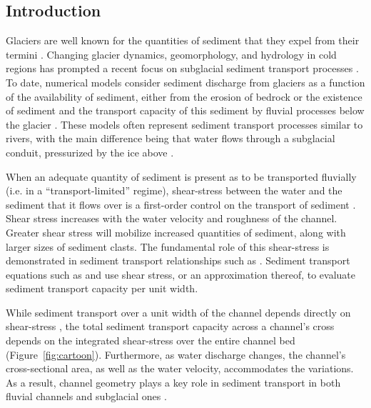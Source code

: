 \documentclass[11pt]{article}
\begin{document}
        
        \begin{spacing}{1}
          \section{Introduction}
           
          Glaciers are well known for the quantities of sediment that they expel from their termini \citep{hallet1996}.
          Changing glacier dynamics, geomorphology, and hydrology in cold regions has prompted a recent focus on subglacial sediment transport processes \citep[e.g.][]{zhang2022}.
          To date, numerical models consider sediment discharge from glaciers as a function of the availability of sediment, either from the erosion of bedrock or the existence of sediment and the transport capacity of this sediment by fluvial processes below the glacier \citep{creyts2013,brinkerhoff2017,beaud2018,delaney2019}.
          These models often represent sediment transport processes similar to rivers, with the main difference being that water flows through a subglacial conduit, pressurized by the ice above \citep{rothlisberger1972}.
        
          When an adequate quantity of sediment is present as to be transported fluvially (i.e. in a ``transport-limited'' regime), shear-stress between the water and the sediment that it flows over is a first-order control on the transport of sediment \citep{shields1936}.
          Shear stress increases with the water velocity and roughness of the channel.
          Greater shear stress will mobilize increased quantities of sediment, along with larger sizes of sediment clasts.
          The fundamental role of this shear-stress is demonstrated in sediment transport relationships such as \citet{shields1936}.
          Sediment transport equations such as \citet{meyer1948}  and \citet{engelund1967} use shear stress, or an approximation thereof, to evaluate sediment transport capacity per unit width.
        
          While sediment transport over a unit width of the channel depends directly on shear-stress \citep[e.g.][]{meyer1948}, the total sediment transport capacity across a channel's cross depends on the integrated shear-stress over the entire channel bed (Figure~\ref{fig:cartoon}).
          Furthermore, as water discharge changes, the channel's cross-sectional area, as well as the water velocity, accommodates the variations.
          As a result, channel geometry plays a key role in sediment transport in both fluvial channels and subglacial ones \citep[e.g.][]{church2006,delaney2019}.
          

\end{spacing}
\end{document}
